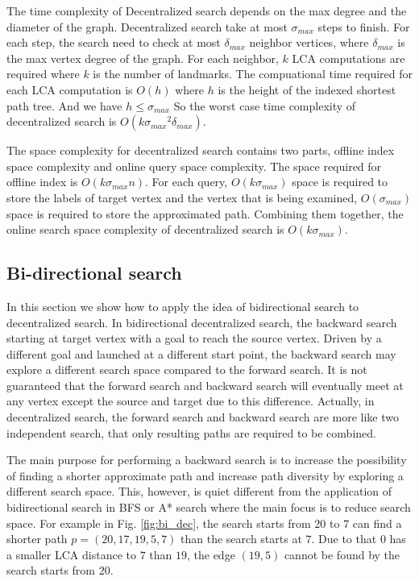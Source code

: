 The time complexity of Decentralized search depends on the max degree and the diameter of the graph. Decentralized search take at most ${\sigma}_{max}$ steps to finish. For each step, the search need to check at most ${\delta}_{max}$ neighbor vertices, where ${\delta}_{max}$ is the max vertex degree of the graph. For each neighbor, $k$ LCA computations are required where $k$ is the number of landmarks. The compuational time required for each LCA computation is $O(h)$ where $h$ is the height of the indexed shortest path tree. And we have $h \leq {\sigma}_{max}$ So the worst case time complexity of decentralized search is $O(k{{\sigma}_{max}}^2{\delta}_{max})$. 

The space complexity for decentralized search contains two parts, offline index space complexity and online query space complexity. The space required for offline index is $O(k{\sigma}_{max}n)$. For each query, $O(k{\sigma}_{max})$ space is required to store the labels of target vertex and the vertex that is being examined, $O({\sigma}_{max})$ space is required to store the approximated path. Combining them together, the online search space complexity of decentralized search is $O(k{\sigma}_{max})$.

\subsection{Bi-directional search}

In this section we show how to apply the idea of bidirectional search to decentralized search. In bidirectional decentralized search, the backward search starting at target vertex with a goal to reach the source vertex. Driven by a different goal and launched at a different start point, the backward search may explore a different search space compared to the forward search. It is not guaranteed that the forward search and backward search will eventually meet at any vertex except the source and target due to this difference. Actually, in decentralized search, the forward search and backward search are more like two independent search, that only resulting paths are required to be combined.

The main purpose for performing a backward search is to increase the possibility of finding a shorter approximate path and increase path diversity by exploring a different search space. This, however, is quiet different from the application of bidirectional search in BFS or A* search where the main focus is to reduce search space. For example in Fig. \ref{fig:bi_dec}, the search starts from $20$ to $7$ can find a shorter path $p = (20, 17, 19, 5, 7)$ than the search starts at $7$. Due to that $0$ has a smaller LCA distance to $7$ than $19$, the edge $(19, 5)$ cannot be found by the search starts from $20$. 

